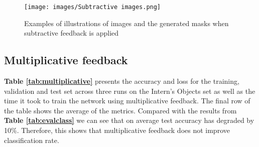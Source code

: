 \documentclass{l4proj}
\begin{document}
\begin{figure}[H]
    \centering
    \texttt{[image: images/Subtractive images.png]}
    \caption{Examples of illustrations of images and the generated masks when subtractive feedback is applied}
    \label{fig:subtractivemask} 
\end{figure}




\subsection{Multiplicative feedback}

\textbf{Table \ref{tab:multiplicative}} presents the accuracy and loss for the training, validation and test set across three runs on the Intern's Objects set as well as the time it took to train the network using multiplicative feedback. The final row of the table shows the average of the metrics.
Compared with the results from \textbf{Table \ref{tab:evalclass}} we can see that on average test accuracy has degraded by 10\%. Therefore, this shows that multiplicative feedback does not improve classification rate.
\end{document}
